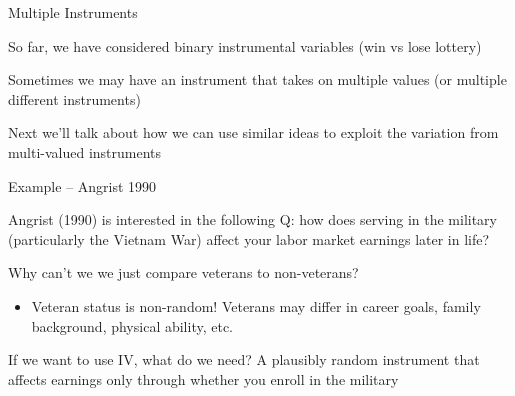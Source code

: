 \documentclass[11pt,english,handout]{beamer}
\newenvironment{wideitemize}{\itemize\addtolength{\itemsep}{10pt}}{\enditemize}
\begin{document}
\begin{frame}{Multiple Instruments}
	\begin{wideitemize}
		\item
		So far, we have considered binary instrumental variables (win vs lose lottery)
		
		\item
		Sometimes we may have an instrument that takes on multiple values (or multiple different instruments) 
		
		
		\item
		Next we'll talk about how we can use similar ideas to exploit the variation from multi-valued instruments
				
	\end{wideitemize}
\end{frame}

\begin{frame}{Example -- Angrist 1990}
	\begin{wideitemize}
		\item
		Angrist (1990) is interested in the following Q: how does serving in the military (particularly the Vietnam War) affect your labor market earnings later in life? 
		
		\pause
		\item
		Why can't we we just compare veterans to non-veterans?
			\pause
			\begin{itemize}
				\item 
				Veteran status is non-random! Veterans may differ in career goals, family background, physical ability, etc. 
			\end{itemize}
		
		\pause
		\item
		If we want to use IV, what do we need? \pause A plausibly random instrument that affects earnings only through whether you enroll in the military
	\end{wideitemize}
\end{frame}
\end{document}
